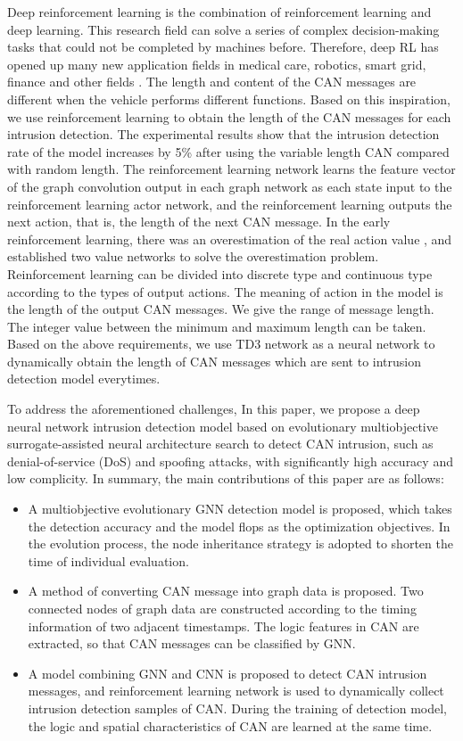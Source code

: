 \documentclass[lettersize,journal]{IEEEtran}
\begin{document}
Deep reinforcement learning is the combination of reinforcement learning and deep learning. This research field can solve a series of complex decision-making tasks that could not be completed by machines before. Therefore, deep RL has opened up many new application fields in medical care, robotics, smart grid, finance and other fields \cite{40}. The length and content of the CAN messages are different when the vehicle performs different functions. Based on this inspiration, we use reinforcement learning to obtain the length of the CAN messages for each intrusion detection. The experimental results show that the intrusion detection rate of the model increases by 5\% after using the variable length CAN compared with random length. The reinforcement learning network learns the feature vector of the graph convolution output in each graph network as each state input to the reinforcement learning actor network, and the reinforcement learning outputs the next action, that is, the length of the next CAN message. In the early reinforcement learning, there was an overestimation of the real action value \cite{41}, and \cite{42} established two value networks to solve the overestimation problem. Reinforcement learning can be divided into discrete type and continuous type according to the types of output actions. The meaning of action in the model is the length of the output CAN messages. We give the range of message length. The integer value between the minimum and maximum length can be taken. Based on the above requirements, we use TD3\cite{43} network as a neural network to dynamically obtain the length of CAN messages which are sent to intrusion detection model everytimes.

To address the aforementioned challenges, In this paper, we propose a deep neural network intrusion detection model based on evolutionary multiobjective surrogate-assisted neural architecture search to detect CAN intrusion, such as denial-of-service (DoS) and spooﬁng attacks, with significantly high accuracy and low complicity. In summary, the main contributions of this paper are as follows:

\begin{itemize}
\item{A multiobjective evolutionary GNN detection model is proposed, which takes the detection accuracy and the model flops as the optimization objectives. In the evolution process, the node inheritance strategy is adopted to shorten the time of individual evaluation.}
\item{A method of converting CAN message into graph data is proposed. Two connected nodes of graph data are constructed according to the timing information of two adjacent timestamps. The logic features in CAN are extracted, so that CAN messages can be classified by GNN.}
\item{A model combining GNN and CNN is proposed to detect CAN intrusion messages, and reinforcement learning network is used to dynamically collect intrusion detection samples of CAN. During the training of detection model, the logic and spatial characteristics of CAN are learned at the same time.}
\end{itemize}
\end{document}
